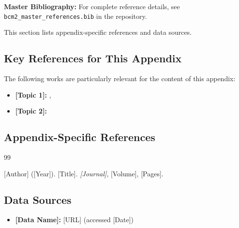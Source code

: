 \begin{tcolorbox}[colback=blue!5!white, colframe=blue!75!black]
\textbf{Master Bibliography:} For complete reference details, see 
\texttt{bcm2\_master\_references.bib} in the repository.

This section lists appendix-specific references and data sources.
\end{tcolorbox}

\vspace{0.5em}

\subsection{Key References for This Appendix}

The following works are particularly relevant for the content of this appendix:

\begin{itemize}[nosep]
    \item \textbf{[Topic 1]:} \citet{key1}, \citet{key2}
    \item \textbf{[Topic 2]:} \citet{key3}
\end{itemize}

\subsection{Appendix-Specific References}


\begin{thebibliography}{99}

\bibitem{[key]} [Author] ([Year]). [Title]. \textit{[Journal]}, [Volume], [Pages].

\end{thebibliography}

\subsection{Data Sources}

\begin{itemize}[nosep]
    \item \textbf{[Data Name]:} [URL] (accessed [Date])
\end{itemize}




